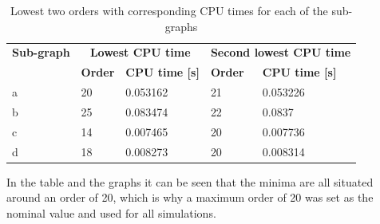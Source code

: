 \begin{table}[H]
\begin{center}
\caption{Lowest two orders with corresponding CPU times for each of the sub-graphs}
\label{tab:orderAndCPUtimes}
\begin{tabular}{|l|l|l|l|l|}
\hline 
\textbf{Sub-graph}  & \multicolumn{2}{c|}{\textbf{Lowest CPU time}} & \multicolumn{2}{c|}{\textbf{Second lowest CPU time}} \\ \cline{2-5}

& \textbf{Order} &
\textbf{CPU time [s]} & \textbf{Order} & \textbf{CPU time [s]} \\ \hline \hline

a & 20 & 0.053162 & 21 & 0.053226 \\ \hline
b & 25 & 0.083474 & 22 & 0.0837 \\ \hline
c & 14 & 0.007465 & 20 & 0.007736 \\ \hline
d & 18 & 0.008273 & 20 & 0.008314 \\ \hline


\end{tabular}
\end{center}
\end{table}

In the table and the graphs it can be seen that the minima are all situated around an order of 20, which is why a maximum order of 20 was set as the nominal value and used for all simulations.


%
%



